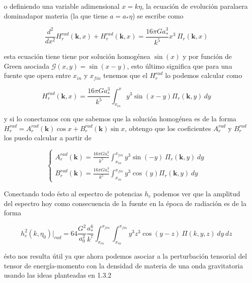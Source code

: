 \noindent
o definiendo una variable adimensional $x = k \eta$, la ecuación de evolución paralaera dominadapor materia (la que tiene $a = a_* \eta$) se escribe como

\begin{equation}
    \frac{d^2}{dx^2} H_r^{rad} (\textbf{k}, x) + H_r^{rad} (\textbf{k}, x) = \frac{16 \pi G a_*^3}{k^5} x^3 \ \Pi_r (\textbf{k}, x)
\end{equation}

\noindent
esta ecuación tiene tiene por solución homogénea $\sin(x)$ y por función de Green asociada $\mathcal{G} (x,y) = \sin(x - y)$, esto último significa que para una fuente que opera entre $x_{in}$ y $x_{fin}$ tenemos que el $H_r^{rad}$ lo podemos calcular como

\begin{equation}
    H^{rad}_r (\textbf{k}, x) = \frac{16 \pi G a_*^3}{k^5} \int_{x_{in}}^{x} y^3 \sin (x - y) \Pi_r (\textbf{k}, y) \ dy
\end{equation}

\noindent
y si lo conectamos con que sabemos que la solución homogénea es de la forma $\displaystyle H_r^{rad} = A_r^{rad} (\textbf{k}) \cos x + B_r^{rad} (\textbf{k}) \sin x$, obtengo que los coeficientes $A_r^{rad}$ y $B_r^{rad}$ los puedo calcular a partir de 

\begin{equation}
    \begin{cases}
        \displaystyle A_r^{rad} (\textbf{k}) = \frac{16 \pi G a_*^3}{k^5}\int_{x_{in}}^{x_{fin}} y^3 \sin (-y) \ \Pi_r (\textbf{k}, y) \ dy \\
        \displaystyle B_r^{rad} (\textbf{k}) = \frac{16 \pi G a_*^3}{k^5} \int_{x_{in}}^{x_{fin}} y^3 \cos (y) \Pi_r (\textbf{k}, y) \ dy
        \end{cases}
\end{equation}

Conectando todo ésto al espectro de potencias $h_c$ podemos ver que la amplitud del espectro hoy como consecuencia de la fuente en la época de radiación es de la forma

\begin{equation}
    h_c^2 (k, \eta_0) |_{rad} = 64 \frac{G^2}{a_0^2} \frac{a_*^6}{k^7} \int_{x_{in}}^{x_{fin}} \int_{x_{in}}^{x_{fin}} y^3 z^3 \cos (y - z) \ \Pi(k, y, z) \ dy \ dz
\end{equation}

\noindent
ésto nos resulta útil ya que ahora podemos asociar a la perturbación tensorial del tensor de energía-momento con la densidad de materia de una onda gravitatoria usando las ideas planteadas en 1.3.2

